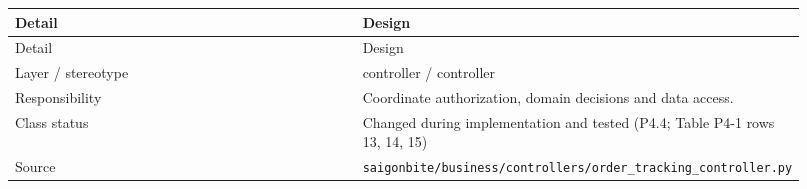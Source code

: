 \begin{longtable}{>{\raggedright\arraybackslash}p{0.4600\linewidth}>{\raggedright\arraybackslash}p{0.4600\linewidth}}
Detail & Design \\
\hline\endfirsthead
Detail & Design \\
\hline\endhead
Layer / stereotype & controller / \guillemotleft{}controller\guillemotright{} \\
Responsibility & Coordinate authorization, domain decisions and data access. \\
Class status & Changed during implementation and tested (P4.4; Table P4-1 rows 13, 14, 15) \\
Source & \texttt{saigonbite/\allowbreak{}business/\allowbreak{}controllers/\allowbreak{}order\_\allowbreak{}tracking\_\allowbreak{}controller.\allowbreak{}py} \\
\end{longtable}
